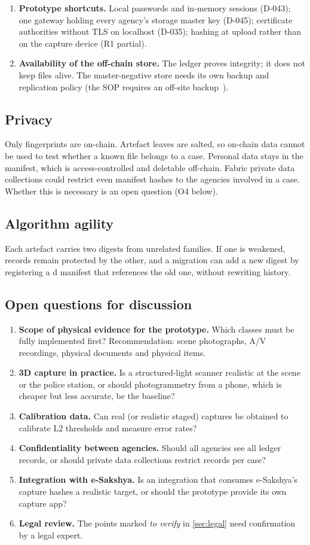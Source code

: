 \begin{enumerate}
  \item \textbf{Prototype shortcuts.} Local passwords and in-memory sessions (D-043); one gateway holding every agency's storage master key (D-045); certificate authorities without TLS on localhost (D-035); hashing at upload rather than on the capture device (R1 partial).
  \item \textbf{Availability of the off-chain store.} The ledger proves integrity; it does not keep files alive. The master-negative store needs its own backup and replication policy (the SOP requires an off-site backup~\cite{sopbnss}).
\end{enumerate}

\subsection{Privacy}
Only fingerprints are on-chain. Artefact leaves are salted, so on-chain data cannot be used to test whether a known file belongs to a case. Personal data stays in the manifest, which is access-controlled and deletable off-chain. Fabric private data collections could restrict even manifest hashes to the agencies involved in a case. Whether this is necessary is an open question (O4 below).

\subsection{Algorithm agility}
Each artefact carries two digests from unrelated families. If one is weakened, records remain protected by the other, and a migration can add a new digest by registering a d manifest that references the old one, without rewriting history.

\subsection{Open questions for discussion}
\begin{enumerate}[label=\textbf{O\arabic*}]
  \item \textbf{Scope of physical evidence for the prototype.} Which classes must be fully implemented first? Recommendation: scene photographs, A/V recordings, physical documents and physical items.
  \item \textbf{3D capture in practice.} Is a structured-light scanner realistic at the scene or the police station, or should photogrammetry from a phone, which is cheaper but less accurate, be the baseline?
  \item \textbf{Calibration data.} Can real (or realistic staged) captures be obtained to calibrate L2 thresholds and measure error rates?
  \item \textbf{Confidentiality between agencies.} Should all agencies see all ledger records, or should private data collections restrict records per case?
  \item \textbf{Integration with e-Sakshya.} Is an integration that consumes e-Sakshya's capture hashes a realistic target, or should the prototype provide its own capture app?
  \item \textbf{Legal review.} The points marked \emph{to verify} in \cref{sec:legal} need confirmation by a legal expert.
\end{enumerate}
